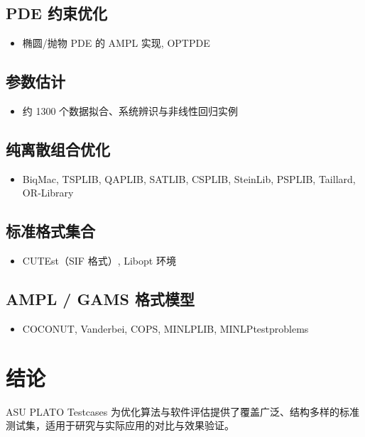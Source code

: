 \documentclass{article}
\begin{document}
\subsection{PDE 约束优化}
\begin{itemize}
  \item 椭圆/抛物 PDE 的 AMPL 实现, OPTPDE
\end{itemize}

\subsection{参数估计}
\begin{itemize}
  \item 约 1300 个数据拟合、系统辨识与非线性回归实例
\end{itemize}

\subsection{纯离散组合优化}
\begin{itemize}
  \item BiqMac, TSPLIB, QAPLIB, SATLIB, CSPLIB, SteinLib, PSPLIB, Taillard, OR‑Library
\end{itemize}

\subsection{标准格式集合}
\begin{itemize}
  \item CUTEst（SIF 格式）, Libopt 环境
\end{itemize}

\subsection{AMPL / GAMS 格式模型}
\begin{itemize}
  \item COCONUT, Vanderbei, COPS, MINLPLIB, MINLPtestproblems
\end{itemize}

\section*{结论}
ASU PLATO Testcases 为优化算法与软件评估提供了覆盖广泛、结构多样的标准测试集，适用于研究与实际应用的对比与效果验证。
\end{document}
